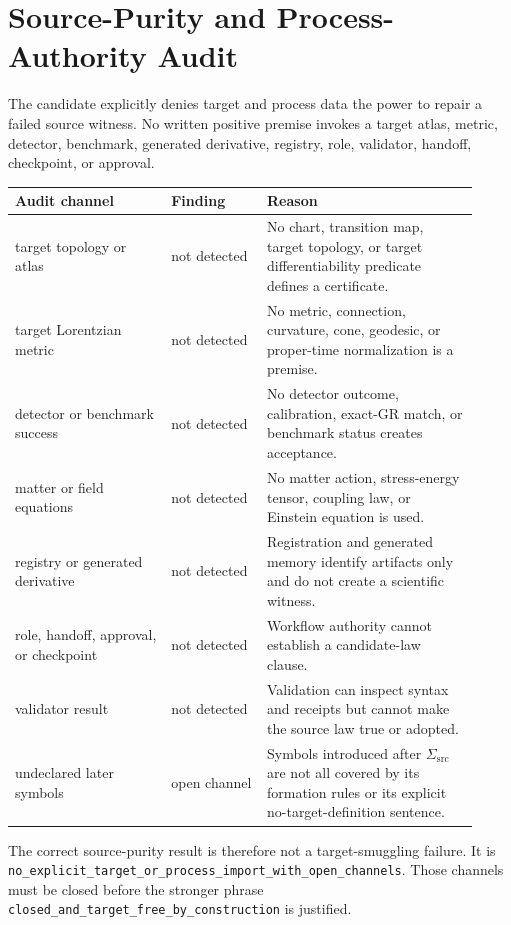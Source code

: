 \documentclass[11pt]{article}
\begin{document}
\section{Source-Purity and Process-Authority Audit}

The candidate explicitly denies target and process data the power to repair a
failed source witness. No written positive premise invokes a target atlas,
metric, detector, benchmark, generated derivative, registry, role, validator,
handoff, checkpoint, or approval.

\begin{longtable}{p{0.31\linewidth}p{0.19\linewidth}p{0.42\linewidth}}
\toprule
Audit channel & Finding & Reason \\
\midrule
target topology or atlas & not detected & No chart, transition map, target topology, or target differentiability predicate defines a certificate. \\
target Lorentzian metric & not detected & No metric, connection, curvature, cone, geodesic, or proper-time normalization is a premise. \\
detector or benchmark success & not detected & No detector outcome, calibration, exact-GR match, or benchmark status creates acceptance. \\
matter or field equations & not detected & No matter action, stress-energy tensor, coupling law, or Einstein equation is used. \\
registry or generated derivative & not detected & Registration and generated memory identify artifacts only and do not create a scientific witness. \\
role, handoff, approval, or checkpoint & not detected & Workflow authority cannot establish a candidate-law clause. \\
validator result & not detected & Validation can inspect syntax and receipts but cannot make the source law true or adopted. \\
undeclared later symbols & open channel & Symbols introduced after \(\Sigma_{\mathrm{src}}\) are not all covered by its formation rules or its explicit no-target-definition sentence. \\
\bottomrule
\end{longtable}

The correct source-purity result is therefore not a target-smuggling failure.
It is
\texttt{no\_explicit\_target\_or\_process\_import\_with\_open\_channels}.
Those channels must be closed before the stronger phrase
\texttt{closed\_and\_target\_free\_by\_construction} is justified.
\end{document}
